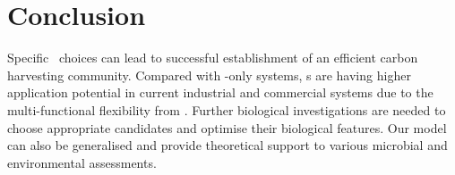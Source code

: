 \documentclass[../thesis.tex]{subfiles} %
\begin{document}
\section{Conclusion}
Specific \bac\ choices can lead to successful establishment of an efficient carbon harvesting community.  Compared with \phy-only systems, \pbs s are having higher application potential in current industrial and commercial systems due to the multi-functional flexibility from \bac.  Further biological investigations are needed to choose appropriate candidates and optimise their biological features.  Our model can also be generalised and provide theoretical support to various microbial and environmental assessments.
\end{document}
